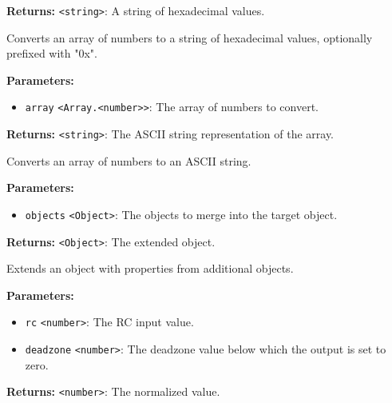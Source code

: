 \documentclass[12pt,a4paper]{article}
\begin{document}
\noindent \textbf{Returns:} \texttt{<string>}: A string of hexadecimal values.

\noindent Converts an array of numbers to a string of hexadecimal values, optionally prefixed with "0x".

\vspace{5mm}
\noindent {}


\noindent \textbf{Parameters:}
\begin{itemize}
  \item \texttt{array} \texttt{<Array.<number>>}: The array of numbers to convert.
\end{itemize}

\noindent \textbf{Returns:} \texttt{<string>}: The ASCII string representation of the array.

\noindent Converts an array of numbers to an ASCII string.

\vspace{5mm}
\noindent {}


\noindent \textbf{Parameters:}
\begin{itemize}
  \item \texttt{objects} \texttt{<Object>}: The objects to merge into the target object.
\end{itemize}

\noindent \textbf{Returns:} \texttt{<Object>}: The extended object.

\noindent Extends an object with properties from additional objects.

\vspace{5mm}
\noindent {}


\noindent \textbf{Parameters:}
\begin{itemize}
  \item \texttt{rc} \texttt{<number>}: The RC input value.
  \item \texttt{deadzone} \texttt{<number>}: The deadzone value below which the output is set to zero.
\end{itemize}

\noindent \textbf{Returns:} \texttt{<number>}: The normalized value.
\end{document}
